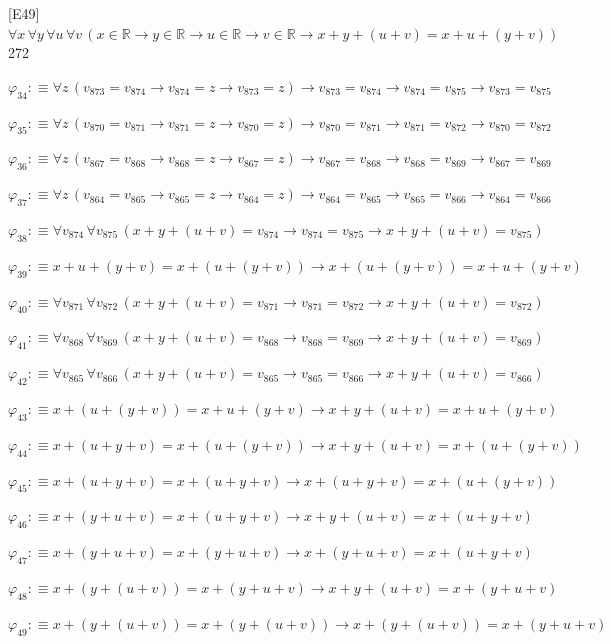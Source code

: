 \begin{fullproof}{[E49]}{$\forall x\,\forall y\,\forall u\,\forall v\,(x \in \mathbb{R} \to y \in \mathbb{R} \to u \in \mathbb{R} \to v \in \mathbb{R} \to x + y + (u + v) = x + u + (y + v))$}{272}
\begin{abbrevlist}
\item $\varphi_{34} :\equiv \forall z\,(v_{873} = v_{874} \to v_{874} = z \to v_{873} = z) \to v_{873} = v_{874} \to v_{874} = v_{875} \to v_{873} = v_{875}$
\item $\varphi_{35} :\equiv \forall z\,(v_{870} = v_{871} \to v_{871} = z \to v_{870} = z) \to v_{870} = v_{871} \to v_{871} = v_{872} \to v_{870} = v_{872}$
\item $\varphi_{36} :\equiv \forall z\,(v_{867} = v_{868} \to v_{868} = z \to v_{867} = z) \to v_{867} = v_{868} \to v_{868} = v_{869} \to v_{867} = v_{869}$
\item $\varphi_{37} :\equiv \forall z\,(v_{864} = v_{865} \to v_{865} = z \to v_{864} = z) \to v_{864} = v_{865} \to v_{865} = v_{866} \to v_{864} = v_{866}$
\item $\varphi_{38} :\equiv \forall v_{874}\,\forall v_{875}\,(x + y + (u + v) = v_{874} \to v_{874} = v_{875} \to x + y + (u + v) = v_{875})$
\item $\varphi_{39} :\equiv x + u + (y + v) = x + (u + (y + v)) \to x + (u + (y + v)) = x + u + (y + v)$
\item $\varphi_{40} :\equiv \forall v_{871}\,\forall v_{872}\,(x + y + (u + v) = v_{871} \to v_{871} = v_{872} \to x + y + (u + v) = v_{872})$
\item $\varphi_{41} :\equiv \forall v_{868}\,\forall v_{869}\,(x + y + (u + v) = v_{868} \to v_{868} = v_{869} \to x + y + (u + v) = v_{869})$
\item $\varphi_{42} :\equiv \forall v_{865}\,\forall v_{866}\,(x + y + (u + v) = v_{865} \to v_{865} = v_{866} \to x + y + (u + v) = v_{866})$
\item $\varphi_{43} :\equiv x + (u + (y + v)) = x + u + (y + v) \to x + y + (u + v) = x + u + (y + v)$
\item $\varphi_{44} :\equiv x + (u + y + v) = x + (u + (y + v)) \to x + y + (u + v) = x + (u + (y + v))$
\item $\varphi_{45} :\equiv x + (u + y + v) = x + (u + y + v) \to x + (u + y + v) = x + (u + (y + v))$
\item $\varphi_{46} :\equiv x + (y + u + v) = x + (u + y + v) \to x + y + (u + v) = x + (u + y + v)$
\item $\varphi_{47} :\equiv x + (y + u + v) = x + (y + u + v) \to x + (y + u + v) = x + (u + y + v)$
\item $\varphi_{48} :\equiv x + (y + (u + v)) = x + (y + u + v) \to x + y + (u + v) = x + (y + u + v)$
\item $\varphi_{49} :\equiv x + (y + (u + v)) = x + (y + (u + v)) \to x + (y + (u + v)) = x + (y + u + v)$

\end{abbrevlist}
\end{fullproof}
